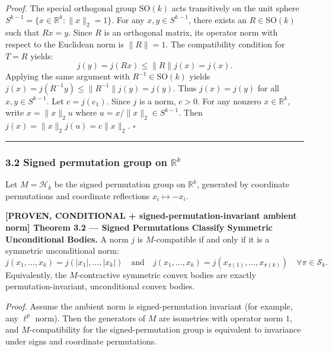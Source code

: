 \documentclass[
  11pt,
]{article}
\begin{document}
\emph{Proof.} The special orthogonal group \(\mathrm{SO}(k)\) acts transitively on the unit sphere \(S^{k-1} = \{x \in \mathbb{R}^k : \|x\|_2 = 1\}\). For any \(x, y \in S^{k-1}\), there exists an \(R \in \mathrm{SO}(k)\) such that \(R x = y\). Since \(R\) is an orthogonal matrix, its operator norm with respect to the Euclidean norm is \(\|R\| = 1\). The compatibility condition for \(T = R\) yields:
\[j(y) = j(R x) \leq \|R\| j(x) = j(x).\]
Applying the same argument with \(R^{-1} \in \mathrm{SO}(k)\) yields \(j(x) = j(R^{-1} y) \leq \|R^{-1}\| j(y) = j(y)\). Thus \(j(x) = j(y)\) for all \(x, y \in S^{k-1}\). Let \(c = j(e_1)\). Since \(j\) is a norm, \(c > 0\). For any nonzero \(x \in \mathbb{R}^k\), write \(x = \|x\|_2 u\) where \(u = x/\|x\|_2 \in S^{k-1}\). Then \(j(x) = \|x\|_2 j(u) = c \|x\|_2\). \(\square\)

\begin{center}\rule{0.5\linewidth}{0.5pt}\end{center}

\subsubsection{\texorpdfstring{3.2 Signed permutation group on \(\mathbb{R}^k\)}{3.2 Signed permutation group on \textbackslash mathbb\{R\}\^{}k}}\label{signed-permutation-group-on-mathbbrk}

Let \(M = \mathcal{H}_k\) be the signed permutation group on \(\mathbb{R}^k\), generated by coordinate permutations and coordinate reflections \(x_i \mapsto -x_i\).

\textbf{{[}PROVEN, CONDITIONAL + signed-permutation-invariant ambient norm{]} Theorem 3.2 --- Signed Permutations Classify Symmetric Unconditional Bodies.} A norm \(j\) is \(M\)-compatible if and only if it is a symmetric unconditional norm:
\[j(x_1, \dots, x_k) = j(|x_1|, \dots, |x_k|) \quad \text{and} \quad j(x_1, \dots, x_k) = j(x_{\pi(1)}, \dots, x_{\pi(k)}) \quad \forall \pi \in \mathcal{S}_k.\]
Equivalently, the \(M\)-contractive symmetric convex bodies are exactly permutation-invariant, unconditional convex bodies.

\emph{Proof.} Assume the ambient norm is signed-permutation invariant (for example, any \(\ell^p\) norm). Then the generators of \(M\) are isometries with operator norm \(1\), and \(M\)-compatibility for the signed-permutation group is equivalent to invariance under signs and coordinate permutations.
\end{document}

